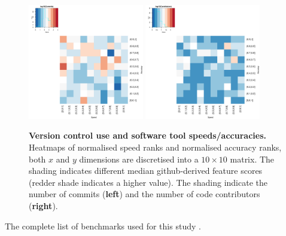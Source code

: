 \documentclass[fleqn,10pt]{SelfArx} %
\begin{document}
\begin{figure}[H]
\centering
\includegraphics[width=0.45\textwidth]{commits-SpeedVsAccuracy-heatmap.pdf}
\includegraphics[width=0.45\textwidth]{contributors-SpeedVsAccuracy-heatmap.pdf}
\caption{{\bf Version control use and software tool speeds/accuracies.}
  Heatmaps of normalised speed ranks and normalised accuracy
  ranks, both $x$ and $y$ dimensions are discretised into a $10 \times
  10$ matrix. The shading indicates different median github-derived
  feature scores (redder shade indicates a higher value).  The shading
  indicate the number of commits ({\bf left}) and the number of code contributors
  ({\bf right}).
 }
\label{fig:heatmapsCommits}
\end{figure}


The complete list of benchmarks used for this study
\cite{pmid32183840,
pmid32138645,
pmid31948481,
pmid31874603,
pmid31984131,
pmid31639029,
pmid31465436,
pmid31324872,
pmid31159850,
pmid31136576,
pmid31080946,
pmid31015787,
pmid30936559,
pmid30717772,
pmid30658573,
pmid29568413,
pmid28934964,
pmid28808243,
pmid28739658,
pmid28569140,
pmid28052134,
pmid27256311,
pmid26862001,
pmid26778510,
pmid26628557,
pmid26220471,
pmid25777524,
pmid25760244,
pmid25574120,
pmid25521762,
pmid25511303,
pmid25198770,
pmid24839440,
pmid24708189,
pmid24602402,
pmid24526711,
pmid24086547,
pmid23842808,
pmid23758764,
pmid23593445,
pmid23393030,
pmid22574964,
pmid22506536,
pmid22492192,
pmid22287634,
pmid22152123,
pmid22172045,
pmid22132132,
pmid21856737,
pmid21615913,
pmid21525877,
pmid21483869,
pmid21423806,
pmid21113338,
pmid20617200,
pmid20047664,
pmid19179695,
pmid19126200,
pmid19046431,
pmid18793413,
pmid18287116,
pmid17151342,
pmid17062146,
pmid15840834,
pmid15701525,
ng2013estimating}.




\end{document}
